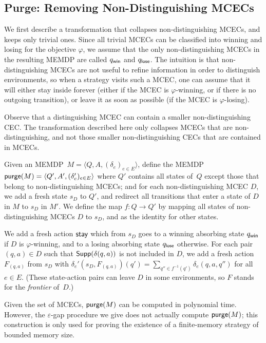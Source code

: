 \documentclass[a4paper,USenglish,cleveref, autoref, thm-restate]{lipics-v2021}
\let\epsilon\varepsilon
\newcommand{\tuple}[1]{\langle #1 \rangle}
\newcommand\Supp{\textrm{\sf Supp}}
\def\loseabsorb{q_{\sf lose}}
\def\winabsorb{q_{\sf win}}
\newcommand\freshaction[1]{F_{#1}}
\newcommand\purge[1]{\textrm{\sf purge}(#1)}
\def\actionstay{\textrm{\sf stay}}
\begin{document}
\subsection{Purge: Removing Non-Distinguishing MCECs}
\label{section:purge}
We first describe a transformation that collapses non-distinguishing MCECs, and keeps only trivial ones.
Since all trivial MCECs can be classified into winning and losing for the objective $\varphi$, we assume that
the only non-distinguishing MCECs in the resulting MEMDP are called $\winabsorb$ and $\loseabsorb$. 
The intuition is that non-distinguishing MCECs are not useful to refine information in order to distinguish environments,
so when a strategy visits such a MCEC, one can assume that it will either stay inside forever (either if the MCEC is $\varphi$-winning, or if there is no outgoing transition), or leave it as soon as possible (if the MCEC is $\varphi$-losing).

Observe that a distinguishing MCEC can contain a smaller non-distinguishing CEC. The transformation described here only collapses MCECs that are non-distinguishing, and not those smaller non-distinguishing CECs that are contained in MCECs.

Given an MEMDP~$M=\tuple{Q,A,(\delta_e)_{e\in E}}$, define
the MEMDP $\purge{M}=\tuple{Q',A',(\delta'_e)_{e\in E}}$ 
where $Q'$ contains all states of~$Q$ except those that belong to non-distinguishing MCECs;
and for each non-distinguishing MCEC $D$, we add a fresh state $s_D$ to $Q'$, and redirect all transitions that enter a state of $D$ in $M$ to $s_D$ in $M'$. 
We define the map $f : Q \rightarrow Q'$ by mapping all states of non-distinguishing MCECs $D$ to $s_D$, and as the identity for other states.

We add a fresh action $\actionstay$ which from $s_D$ goes to a winning absorbing state $\winabsorb$ if $D$ is $\varphi$-winning, and to a losing absorbing state $\loseabsorb$ otherwise.
For each pair $(q,a) \in D$ such that $\Supp(\delta(q,a))$ is not included in $D$, we add a fresh action $\freshaction{(q,a)}$ from $s_D$
with $\delta_e'(s_D, \freshaction{(q,a)})(q') = \sum_{q'' \in f^{-1}(q')} \delta_e(q, a, q'')$ for all $e \in E$.
(These state-action pairs can leave $D$ in some environments, so $F$ stands for the \emph{frontier} of~$D$.)


Given the set of MCECs, $\purge{M}$ can be computed in polynomial time.
However, the $\epsilon$-gap procedure we give does not actually compute $\purge{M}$;
this construction is only used for proving the existence of a finite-memory strategy of bounded memory size.
\end{document}
